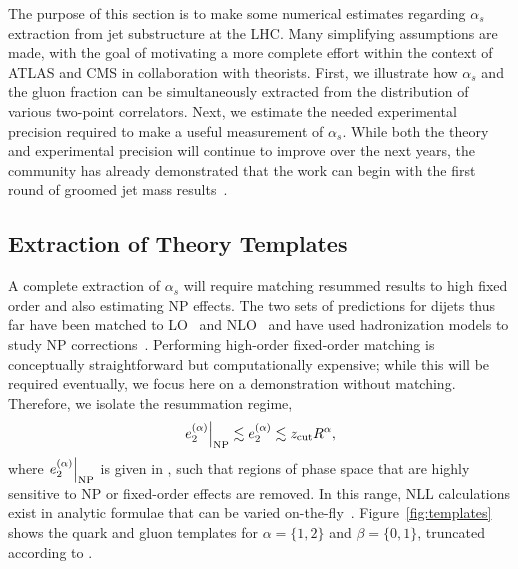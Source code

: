 
The purpose of this section is to make some numerical estimates regarding $\alpha_s$ extraction from jet substructure at the LHC.
%
Many simplifying assumptions are made, with the goal of motivating a more complete effort within the context of ATLAS and CMS in collaboration with theorists.
%
First, we illustrate how $\alpha_s$ and the gluon fraction can be simultaneously extracted from the distribution of various two-point correlators.
%
Next, we estimate the needed experimental precision required to make a useful measurement of $\alpha_s$.
%
While both the theory and experimental precision will continue to improve over the next years, the community has already demonstrated that the work can begin with the first round of groomed jet mass results~\cite{Aaboud:2017qwh,CMS-PAS-SMP-16-010,Frye:2016aiz,Frye:2016okc,Marzani:2017mva,Marzani:2017kqd}.

\subsection{Extraction of Theory Templates}
\label{sec:templates}

A complete extraction of $\alpha_s$ will require matching resummed results to high fixed order and also estimating NP effects.
%
The two sets of predictions for dijets thus far have been matched to LO~\cite{Frye:2016aiz,Frye:2016okc} and NLO~\cite{Marzani:2017mva,Marzani:2017kqd} and have used hadronization models to study NP corrections~\cite{Marzani:2017mva,Marzani:2017kqd}.
%
Performing high-order fixed-order matching is conceptually straightforward but computationally expensive; while this will be required eventually, we focus here on a demonstration without matching.
%
Therefore, we isolate the resummation regime,
\begin{equation}
\label{eq:e2truncation}
\left. e_{2}^{(\alpha)} \right |_{\text{NP}} \lesssim e_{2}^{(\alpha)}\lesssim z_\text{cut}R^\alpha,
\end{equation}
%
where $\left. e_{2}^{(\alpha)} \right |_{\text{NP}}$ is given in , such that regions of phase space that are highly sensitive to NP or fixed-order effects are removed.
%
In this range, NLL calculations exist in analytic formulae that can be varied on-the-fly~\cite{Marzani:2017mva,Marzani:2017kqd}.
%
Figure~\ref{fig:templates} shows the quark and gluon templates for $\alpha=\{1,2\}$ and $\beta=\{0,1\}$, truncated according to .


